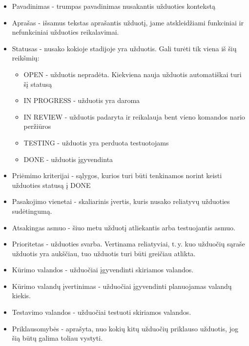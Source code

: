 {\begin{itemize}
    \item Pavadinimas - trumpas pavadinimas nusakantis užduoties kontekstą 
    \item Aprašas - išsamus tekstas aprašantis užduotį, jame atskleidžiami funkciniai ir nefunkciniai užduoties reikalavimai.
    \item Statusas - nusako kokioje stadijoje yra užduotis. Gali turėti tik viena iš šių reikšmių:
    \begin{itemize}
        \item OPEN - užduotis nepradėta. Kiekviena nauja užduotis automatiškai turi šį statusą
        \item IN PROGRESS - užduotis yra daroma
        \item IN REVIEW - užduotis padaryta ir reikalauja bent vieno komandos nario peržiūros
        \item TESTING - užduotis yra perduota testuotojams
        \item DONE - užduotis įgyvendinta
    \end{itemize}
    \item Priėmimo kriterijai - sąlygos, kurios turi būti tenkinamos norint keisti užduoties statusą į DONE
    \item Pasakojimo vienetai - skaliarinis įvertis, kuris nusako reliatyvų užduoties sudėtingumą.
    \item Atsakingas asmuo - šiuo metu užduotį atliekantis arba testuojantis asmuo.
    \item Prioritetas - užduoties svarba. Vertinama reliatyviai, t.\,y. kuo užduočių sąraše užduotis yra aukščiau, tuo užduotis turi būti greičiau atlikta.
    \item Kūrimo valandos - užduočiai įgyvendinti skiriamos valandos.
    \item Kūrimo valandų įvertinimas - užduočiai įgyvendinti planuojamas valandų kiekis.
    \item Testavimo valandos - užduočiai testuoti skiriamos valandos.
    \item Priklausomybės - aprašyta, nuo kokių kitų užduočių priklauso užduotis, jog šią būtų galima toliau vystyti.
\end{itemize}

}


